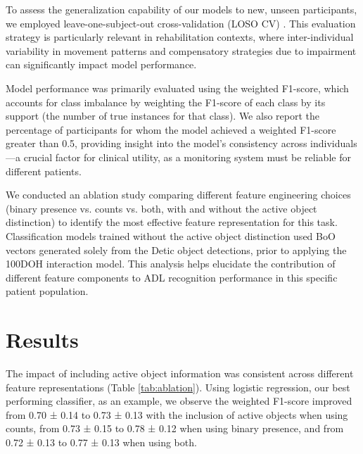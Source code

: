 \documentclass[journal,twoside,web]{ieeecolor}
\begin{document}
To assess the generalization capability of our models to new, unseen participants, we employed leave-one-subject-out cross-validation (LOSO CV) \cite{Gholamiangonabadi2020-dd}. This evaluation strategy is particularly relevant in rehabilitation contexts, where inter-individual variability in movement patterns and compensatory strategies due to impairment can significantly impact model performance.

Model performance was primarily evaluated using the weighted F1-score, which accounts for class imbalance by weighting the F1-score of each class by its support (the number of true instances for that class). We also report the percentage of participants for whom the model achieved a weighted F1-score greater than 0.5, providing insight into the model's consistency across individuals—a crucial factor for clinical utility, as a monitoring system must be reliable for different patients.

We conducted an ablation study comparing different feature engineering choices (binary presence vs. counts vs. both, with and without the active object distinction) to identify the most effective feature representation for this task. Classification models trained without the active object distinction used BoO vectors generated solely from the Detic \cite{Zhou2022-fl} object detections, prior to applying the 100DOH \cite{Shan2020-gh} interaction model. This analysis helps elucidate the contribution of different feature components to ADL recognition performance in this specific patient population.


\section{Results}
The impact of including active object information was consistent across different feature representations (Table \ref{tab:ablation}). Using logistic regression, our best performing classifier, as an example, we observe the weighted F1-score improved from 0.70 ± 0.14 to 0.73 ± 0.13 with the inclusion of active objects when using counts, from 0.73 ± 0.15 to 0.78 ± 0.12 when using binary presence, and from 0.72 ± 0.13 to 0.77 ± 0.13 when using both.
\end{document}
